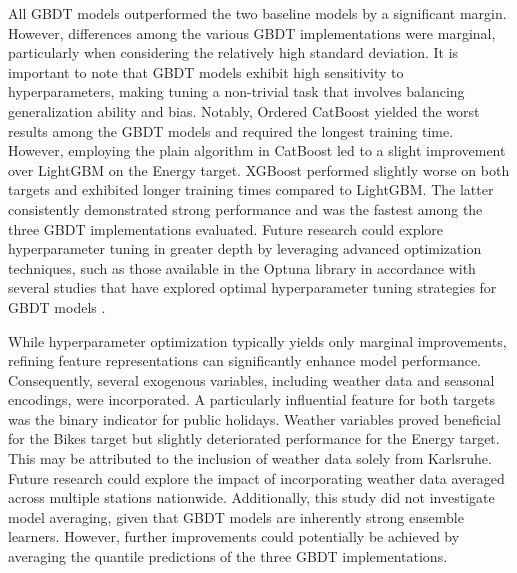 All GBDT models outperformed the two baseline models by a significant margin. However, differences among the various GBDT implementations were marginal, particularly when considering the relatively high standard deviation. It is important to note that GBDT models exhibit high sensitivity to hyperparameters, making tuning a non-trivial task that involves balancing generalization ability and bias. Notably, Ordered CatBoost yielded the worst results among the GBDT models and required the longest training time. However, employing the plain algorithm in CatBoost led to a slight improvement over LightGBM on the Energy target. 
XGBoost performed slightly worse on both targets and exhibited longer training times compared to LightGBM. The latter consistently demonstrated strong performance and was the fastest among the three GBDT implementations evaluated. Future research could explore hyperparameter tuning in greater depth by leveraging advanced optimization techniques, such as those available in the Optuna library \parencite{akiba_optuna_2019} in accordance with several studies that have explored optimal hyperparameter tuning strategies for GBDT models \parencites{florek_benchmarking_2023, bentejac_comparative_2021}.

While hyperparameter optimization typically yields only marginal improvements, refining feature representations can significantly enhance model performance. Consequently, several exogenous variables, including weather data and seasonal encodings, were incorporated. A particularly influential feature for both targets was the binary indicator for public holidays. Weather variables proved beneficial for the Bikes target but slightly deteriorated performance for the Energy target. This may be attributed to the inclusion of weather data solely from Karlsruhe. Future research could explore the impact of incorporating weather data averaged across multiple stations nationwide. Additionally, this study did not investigate model averaging, given that GBDT models are inherently strong ensemble learners. However, further improvements could potentially be achieved by averaging the quantile predictions of the three GBDT implementations.

